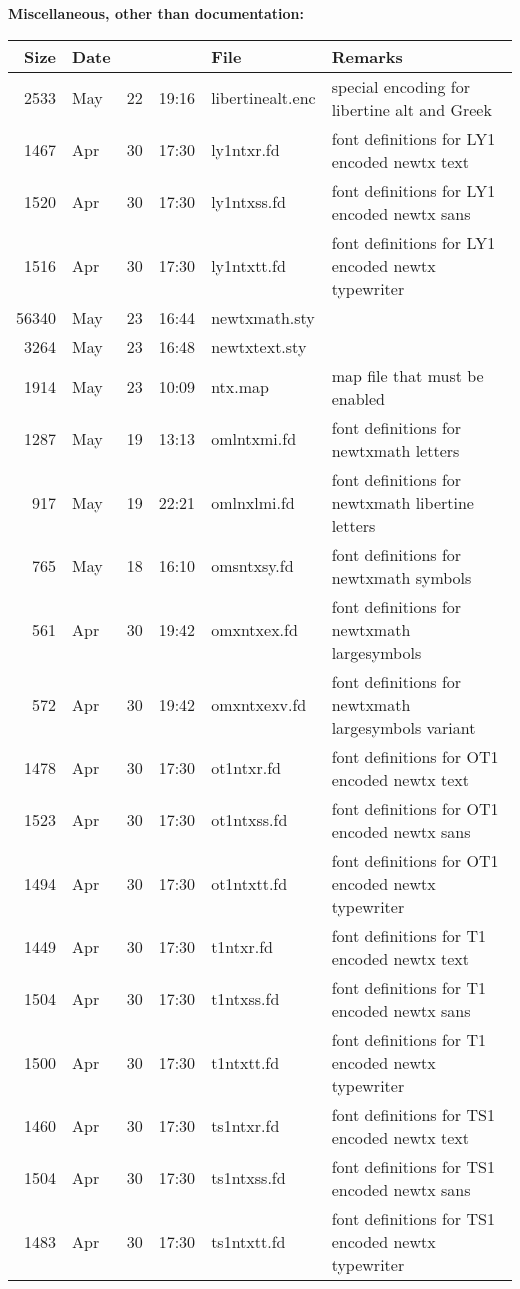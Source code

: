 \documentclass[10pt]{amsart}
\begin{document}
\textbf{Miscellaneous, other than documentation:}

\begin{center}
  \begin{longtable}{@{} rlrrll @{}}
    \toprule
    Size & Date &  &  & File & Remarks \\ 
    \midrule
2533&May&22&19:16&libertinealt.enc& special encoding for libertine alt and Greek\\
1467&Apr&30&17:30&ly1ntxr.fd& font definitions for LY1 encoded newtx text\\
1520&Apr&30&17:30&ly1ntxss.fd& font definitions for LY1 encoded newtx sans\\
1516&Apr&30&17:30&ly1ntxtt.fd& font definitions for LY1 encoded newtx typewriter\\
56340&May&23&16:44&newtxmath.sty\\
3264&May&23&16:48&newtxtext.sty\\
1914&May&23&10:09&ntx.map& map file that must be enabled\\
1287&May&19&13:13&omlntxmi.fd& font definitions for newtxmath letters\\
917&May&19&22:21&omlnxlmi.fd& font definitions for newtxmath libertine letters\\
765&May&18&16:10&omsntxsy.fd& font definitions for newtxmath symbols\\
561&Apr&30&19:42&omxntxex.fd& font definitions for newtxmath largesymbols\\
572&Apr&30&19:42&omxntxexv.fd& font definitions for newtxmath largesymbols variant\\
1478&Apr&30&17:30&ot1ntxr.fd& font definitions for OT1 encoded newtx text\\
1523&Apr&30&17:30&ot1ntxss.fd& font definitions for OT1 encoded newtx sans\\
1494&Apr&30&17:30&ot1ntxtt.fd& font definitions for OT1 encoded newtx typewriter\\
1449&Apr&30&17:30&t1ntxr.fd& font definitions for T1 encoded newtx text\\
1504&Apr&30&17:30&t1ntxss.fd& font definitions for T1 encoded newtx sans\\
1500&Apr&30&17:30&t1ntxtt.fd& font definitions for T1 encoded newtx typewriter\\
1460&Apr&30&17:30&ts1ntxr.fd& font definitions for TS1 encoded newtx text\\
1504&Apr&30&17:30&ts1ntxss.fd& font definitions for TS1 encoded newtx sans\\
1483&Apr&30&17:30&ts1ntxtt.fd& font definitions for TS1 encoded newtx typewriter\\

\end{longtable}
\end{center}
\end{document}
